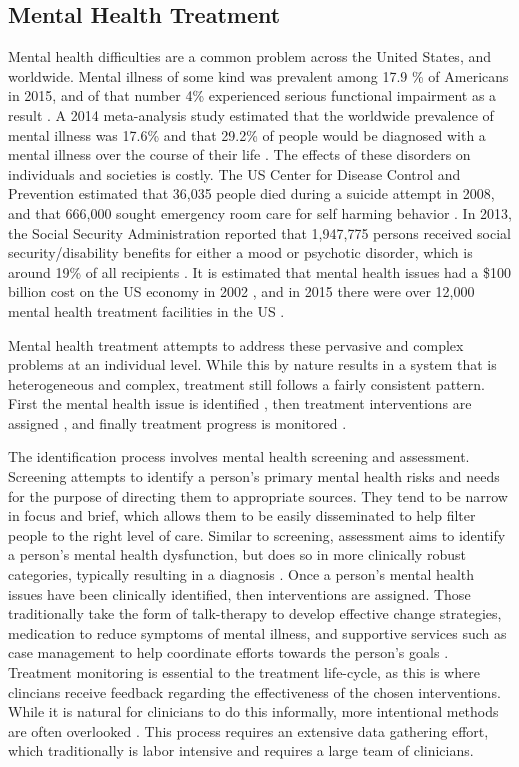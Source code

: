 \documentclass[sigconf]{acmart}
\begin{document}
\subsection{Mental Health Treatment}
Mental health difficulties are a common problem across the United States, and worldwide. Mental illness of some kind was prevalent among 17.9 \% of Americans in 2015, and of that number 4\% experienced serious functional impairment as a result \cite{nihmstats}. A 2014 meta-analysis study estimated that the worldwide prevalence of mental illness was 17.6\% and that 29.2\% of people would be diagnosed with a mental illness over the course of their life \cite{worldprev}. The effects of these disorders on individuals and societies is costly. The US Center for Disease Control and Prevention estimated that 36,035 people died during a suicide attempt in 2008, and that 666,000 sought emergency room care for self harming behavior \cite{cdcsuicide}. In 2013, the Social Security Administration reported that 1,947,775 persons received social security/disability benefits for either a mood or psychotic disorder, which is around 19\% of all recipients \cite{ssarecipients}. It is estimated that mental health issues had a \$100 billion cost on the US economy in 2002 \cite{nihmstats}, and in 2015 there were over 12,000 mental health treatment facilities in the US \cite{n-mhss2015}.

Mental health treatment attempts to address these pervasive and complex problems at an individual level. While this by nature results in a system that is heterogeneous and complex, treatment still follows a fairly consistent pattern. First the mental health issue is identified \cite{apapractscreeassess}, then treatment interventions are assigned \cite{samhsatx}, and finally treatment progress is monitored \cite{progressmonitoring}.

The identification process involves mental health screening and assessment. Screening attempts to identify a person's primary mental health risks and needs for the purpose of directing them to appropriate sources. They tend to be narrow in focus and brief, which allows them to be easily disseminated to help filter people to the right level of care. Similar to screening, assessment aims to identify a person's mental health dysfunction, but does so in more clinically robust categories, typically resulting in a diagnosis \cite{apapractscreeassess}. 
Once a person's mental health issues have been clinically identified, then interventions are assigned. Those traditionally take the form of talk-therapy to develop effective change strategies, medication to reduce symptoms of mental illness, and supportive services such as case management to help coordinate efforts towards the person's goals \cite{samhsatx}.
Treatment monitoring is essential to the treatment life-cycle, as this is where clincians receive feedback regarding the effectiveness of the chosen interventions. While it is natural for clinicians to do this informally, more intentional methods are often overlooked \cite{progressmonitoring}.
This process requires an extensive data gathering effort, which traditionally is labor intensive and requires a large team of clinicians.
\end{document}
